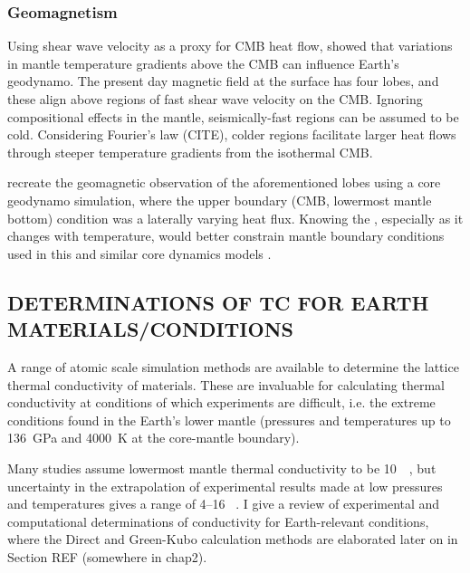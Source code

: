 \subsubsection{Geomagnetism}

Using shear wave velocity as a proxy for CMB heat flow, \citet{Gubbins2007} showed that variations in mantle temperature gradients above the CMB can influence Earth's geodynamo. The present day magnetic field at the surface has four lobes, and these align above regions of fast shear wave velocity on the CMB. Ignoring compositional effects in the mantle, seismically-fast regions can be assumed to be cold. Considering Fourier's law (CITE), colder regions facilitate larger heat flows through steeper temperature gradients from the isothermal CMB.

\citet{Gubbins2007} recreate the geomagnetic observation of the aforementioned lobes using a core geodynamo simulation, where the upper boundary (CMB, lowermost mantle bottom) condition was a laterally varying heat flux. Knowing the \tc, especially as it changes with temperature, would better constrain mantle boundary conditions used in this and similar core dynamics models \citep{Ammann2014}.



\subsection{DETERMINATIONS OF TC FOR EARTH MATERIALS/CONDITIONS}

A range of atomic scale simulation methods are available to determine the lattice thermal conductivity of materials. These are invaluable for calculating thermal conductivity at conditions of which experiments are difficult, i.e. the extreme conditions found in the Earth's lower mantle (pressures and temperatures up to 136~GPa and 4000~K at the core-mantle boundary). 

Many studies assume lowermost mantle thermal conductivity to be 10~\wmk\ \citep[e.g.][]{Lay2008}, but uncertainty in the extrapolation of experimental results made at low pressures and temperatures gives a range of 4--16 \wmk~\citep{Brown1986, Osako1991, Hofmeister1999, Goncharov2009, Manthilake2011, Ohta2012}. I give a review of experimental and computational determinations of conductivity for Earth-relevant conditions, where the Direct and Green-Kubo calculation methods are elaborated later on in Section REF (somewhere in chap2).

